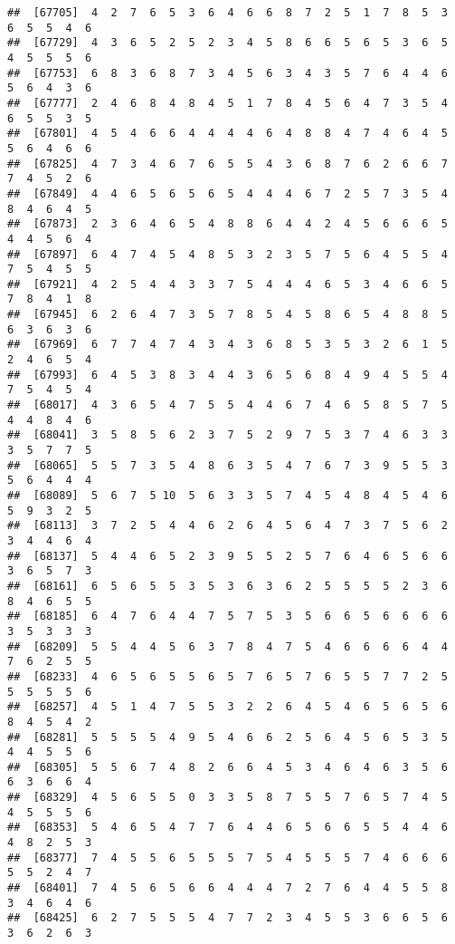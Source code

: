 \documentclass[
]{book}
\begin{document}
\begin{verbatim}
##  [67705]  4  2  7  6  5  3  6  4  6  6  8  7  2  5  1  7  8  5  3  6  5  5  4  6
##  [67729]  4  3  6  5  2  5  2  3  4  5  8  6  6  5  6  5  3  6  5  4  5  5  5  6
##  [67753]  6  8  3  6  8  7  3  4  5  6  3  4  3  5  7  6  4  4  6  5  6  4  3  6
##  [67777]  2  4  6  8  4  8  4  5  1  7  8  4  5  6  4  7  3  5  4  6  5  5  3  5
##  [67801]  4  5  4  6  6  4  4  4  4  6  4  8  8  4  7  4  6  4  5  5  6  4  6  6
##  [67825]  4  7  3  4  6  7  6  5  5  4  3  6  8  7  6  2  6  6  7  7  4  5  2  6
##  [67849]  4  4  6  5  6  5  6  5  4  4  4  6  7  2  5  7  3  5  4  8  4  6  4  5
##  [67873]  2  3  6  4  6  5  4  8  8  6  4  4  2  4  5  6  6  6  5  4  4  5  6  4
##  [67897]  6  4  7  4  5  4  8  5  3  2  3  5  7  5  6  4  5  5  4  7  5  4  5  5
##  [67921]  4  2  5  4  4  3  3  7  5  4  4  4  6  5  3  4  6  6  5  7  8  4  1  8
##  [67945]  6  2  6  4  7  3  5  7  8  5  4  5  8  6  5  4  8  8  5  6  3  6  3  6
##  [67969]  6  7  7  4  7  4  3  4  3  6  8  5  3  5  3  2  6  1  5  2  4  6  5  4
##  [67993]  6  4  5  3  8  3  4  4  3  6  5  6  8  4  9  4  5  5  4  7  5  4  5  4
##  [68017]  4  3  6  5  4  7  5  5  4  4  6  7  4  6  5  8  5  7  5  4  4  8  4  6
##  [68041]  3  5  8  5  6  2  3  7  5  2  9  7  5  3  7  4  6  3  3  3  5  7  7  5
##  [68065]  5  5  7  3  5  4  8  6  3  5  4  7  6  7  3  9  5  5  3  5  6  4  4  4
##  [68089]  5  6  7  5 10  5  6  3  3  5  7  4  5  4  8  4  5  4  6  5  9  3  2  5
##  [68113]  3  7  2  5  4  4  6  2  6  4  5  6  4  7  3  7  5  6  2  3  4  4  6  4
##  [68137]  5  4  4  6  5  2  3  9  5  5  2  5  7  6  4  6  5  6  6  3  6  5  7  3
##  [68161]  6  5  6  5  5  3  5  3  6  3  6  2  5  5  5  5  2  3  6  8  4  6  5  5
##  [68185]  6  4  7  6  4  4  7  5  7  5  3  5  6  6  5  6  6  6  6  3  5  3  3  3
##  [68209]  5  5  4  4  5  6  3  7  8  4  7  5  4  6  6  6  6  4  4  7  6  2  5  5
##  [68233]  4  6  5  6  5  5  6  5  7  6  5  7  6  5  5  7  7  2  5  5  5  5  5  6
##  [68257]  4  5  1  4  7  5  5  3  2  2  6  4  5  4  6  5  6  5  6  8  4  5  4  2
##  [68281]  5  5  5  5  4  9  5  4  6  6  2  5  6  4  5  6  5  3  5  4  4  5  5  6
##  [68305]  5  5  6  7  4  8  2  6  6  4  5  3  4  6  4  6  3  5  6  6  3  6  6  4
##  [68329]  4  5  6  5  5  0  3  3  5  8  7  5  5  7  6  5  7  4  5  4  5  5  5  6
##  [68353]  5  4  6  5  4  7  7  6  4  4  6  5  6  6  5  5  4  4  6  4  8  2  5  3
##  [68377]  7  4  5  5  6  5  5  5  7  5  4  5  5  5  7  4  6  6  6  5  5  2  4  7
##  [68401]  7  4  5  6  5  6  6  4  4  4  7  2  7  6  4  4  5  5  8  3  4  6  4  6
##  [68425]  6  2  7  5  5  5  4  7  7  2  3  4  5  5  3  6  6  5  6  3  6  2  6  3

\end{verbatim}
\end{document}
